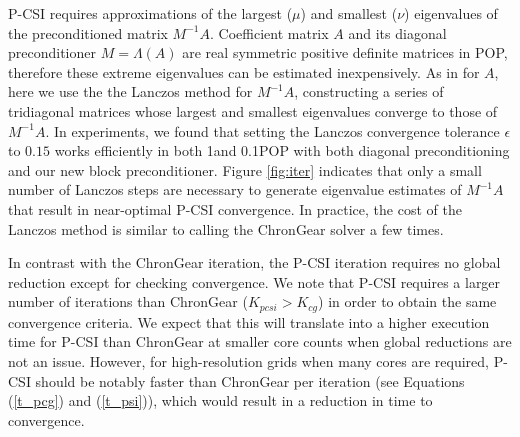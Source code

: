 P-CSI requires approximations of the largest ($\mu$) and
smallest ($\nu$) eigenvalues of the preconditioned
matrix $M^{-1}A$. Coefficient matrix $A$ and its diagonal
preconditioner $M = \Lambda(A)$ are real symmetric positive definite
matrices in POP, therefore these extreme eigenvalues can be
estimated inexpensively.  As in \cite{hu2013scalable} for $A$, here we use the the Lanczos
method \cite{Paige1980235} for $M^{-1}A$, constructing a series of tridiagonal
matrices whose largest and smallest eigenvalues
converge to those of $M^{-1}A$.
In experiments, we found that setting the
Lanczos convergence tolerance $\epsilon$ to $0.15$ works efficiently
in both 1\degree\space and 0.1\degree\space POP with both diagonal
preconditioning and our new block  preconditioner.
Figure \ref{fig:iter} indicates that only a small number of Lanczos steps
are necessary to generate eigenvalue estimates of $M^{-1}A$ that result in near-optimal P-CSI
convergence.
In practice, the cost of the Lanczos method is similar to
calling the ChronGear solver a few times.


In contrast with the ChronGear iteration,  the P-CSI iteration
requires no global reduction except for checking convergence.
We note that P-CSI requires a larger number of iterations than ChronGear ($K_{pcsi} > K_{cg}$)
in order to obtain the same convergence criteria.
We expect that this will translate into a
higher execution time for P-CSI than ChronGear at smaller core counts
when global reductions are not an issue.  However, for high-resolution
grids when many cores are required, P-CSI should be notably faster than
ChronGear per iteration (see Equations (\ref{t_pcg}) and
(\ref{t_psi})), which would result in a reduction in time to convergence.





